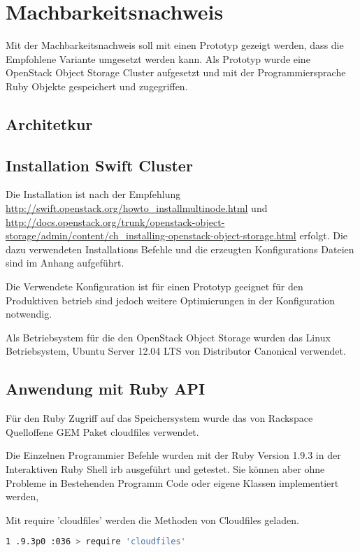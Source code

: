 \cleardoublepage
\chapter{Machbarkeitsnachweis}
Mit der Machbarkeitsnachweis soll mit einen Prototyp gezeigt werden, dass die Empfohlene Variante umgesetzt werden kann. Als Prototyp wurde eine OpenStack Object Storage Cluster aufgesetzt und mit der Programmiersprache Ruby Objekte gespeichert und zugegriffen.

\section{Architetkur}

\section{Installation Swift Cluster}

Die Installation ist nach der Empfehlung \url{http://swift.openstack.org/howto_installmultinode.html} und \url{http://docs.openstack.org/trunk/openstack-object-storage/admin/content/ch_installing-openstack-object-storage.html} erfolgt. Die dazu verwendeten Installations Befehle und die erzeugten Konfigurations Dateien sind im Anhang aufgeführt.

Die Verwendete Konfiguration ist für einen Prototyp geeignet für den Produktiven betrieb sind jedoch weitere Optimierungen in der Konfiguration notwendig.

Als Betriebsystem für die den OpenStack Object Storage wurden das Linux Betriebsystem, Ubuntu Server 12.04 LTS von Distributor Canonical verwendet.
 
 
\section{Anwendung mit Ruby API}
Für den Ruby Zugriff auf das Speichersystem wurde das von Rackspace Quelloffene GEM Paket cloudfiles verwendet.

Die Einzelnen Programmier Befehle wurden mit der Ruby Version 1.9.3 in der Interaktiven Ruby Shell irb ausgeführt und getestet. Sie können aber ohne Probleme in Bestehenden Programm Code oder eigene Klassen implementiert werden,
 
Mit require 'cloudfiles' werden die Methoden von Cloudfiles geladen.
\begin{lstlisting}[label=requireCloudfiles, language=Bash, caption=Laden ] 
 1 .9.3p0 :036 > require 'cloudfiles'
\end{lstlisting}

